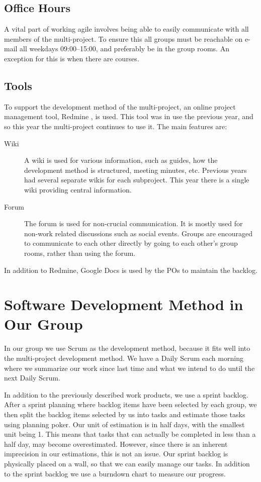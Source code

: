 \subsection{Office Hours}
A vital part of working agile involves being able to easily communicate with all members of the multi-project. To ensure this all groups must be reachable on e-mail all weekdays 09:00--15:00, and preferably be in the group rooms. An exception for this is when there are courses.

\subsection{Tools}\label{sec:tools}
To support the development method of the multi-project, an online project management tool, Redmine \parencite{redmine-website}, is used. This tool was in use the previous year, and so this year the multi-project continues to use it. The main features are:

\begin{description}
  \item[Wiki] A wiki is used for various information, such as guides, how the development method is structured, meeting minutes, etc. Previous years had several separate wikis for each subproject. This year there is a single wiki providing central information.
  \item[Forum] The forum is used for non-crucial communication. It is mostly used for non-work related discussions such as social events. Groups are encouraged to communicate to each other directly by going to each other's group rooms, rather than using the forum.
\end{description}

In addition to Redmine, Google Docs is used by the POs to maintain the backlog.

\section{Software Development Method in Our Group}\label{sec:swmethod_ourgroup}
In our group we use Scrum as the development method, because it fits well into the multi-project development method. We have a Daily Scrum each morning where we summarize our work since last time and what we intend to do until the next Daily Scrum.

In addition to the previously described work products, we use a sprint backlog. After a sprint planning where backlog items have been selected by each group, we then split the backlog items selected by us into tasks and estimate those tasks using planning poker. Our unit of estimation is in half days, with the smallest unit being 1. This means that tasks that can actually be completed in less than a half day, may become overestimated. However, since there is an inherent imprecision in our estimations, this is not an issue. Our sprint backlog is physically placed on a wall, so that we can easily manage our tasks. In addition to the sprint backlog we use a burndown chart to measure our progress.

